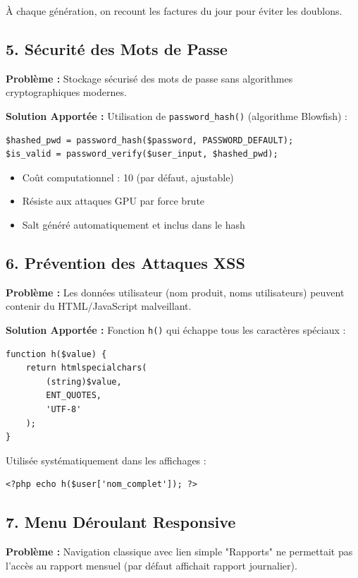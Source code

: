 \documentclass[12pt,a4paper]{report}
\begin{document}
À chaque génération, on recount les factures du jour pour éviter les doublons.

\subsection{5. Sécurité des Mots de Passe}

\textbf{Problème :}
Stockage sécurisé des mots de passe sans algorithmes cryptographiques modernes.

\textbf{Solution Apportée :}
Utilisation de \texttt{password\_hash()} (algorithme Blowfish) :
\begin{lstlisting}
$hashed_pwd = password_hash($password, PASSWORD_DEFAULT);
$is_valid = password_verify($user_input, $hashed_pwd);
\end{lstlisting}

\begin{itemize}
    \item Coût computationnel : 10 (par défaut, ajustable)
    \item Résiste aux attaques GPU par force brute
    \item Salt généré automatiquement et inclus dans le hash
\end{itemize}

\subsection{6. Prévention des Attaques XSS}

\textbf{Problème :}
Les données utilisateur (nom produit, noms utilisateurs) peuvent contenir du HTML/JavaScript malveillant.

\textbf{Solution Apportée :}
Fonction \texttt{h()} qui échappe tous les caractères spéciaux :
\begin{lstlisting}
function h($value) {
    return htmlspecialchars(
        (string)$value, 
        ENT_QUOTES, 
        'UTF-8'
    );
}
\end{lstlisting}

Utilisée systématiquement dans les affichages :
\begin{lstlisting}
<?php echo h($user['nom_complet']); ?>
\end{lstlisting}

\subsection{7. Menu Déroulant Responsive}

\textbf{Problème :}
Navigation classique avec lien simple "Rapports" ne permettait pas l'accès au rapport mensuel (par défaut affichait rapport journalier).
\end{document}
